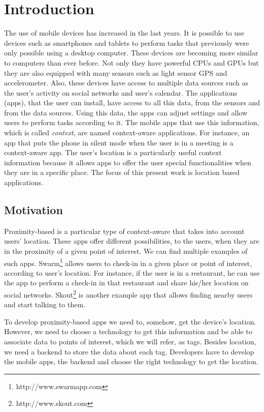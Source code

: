 
\chapter{Introduction}
\label{chapter:introduction}
The use of mobile devices has increased in the last years.
It is possible to use devices such as smartphones and tablets to perform tasks that previously were only possible using a desktop computer.
These devices are becoming more similar to computers than ever before.
Not only they have powerful \glspl{CPU} and \glspl{GPU} but they are also equipped with many sensors such as light sensor \gls{GPS} and accelerometer.
Also, these devices have access to multiple data sources such as
the user's activity on social networks and user's calendar.
The applications (apps), that the user can install, have access to all this data, from the sensors and from the data sources.
Using this data, the apps can adjust settings and allow users to perform tasks according to it.
The mobile apps that use this information, which is called \emph{context}, are named context-aware applications.
For instance, an app that puts the phone in silent mode when the user is in a meeting is a context-aware app.
The user's location is a particularly useful context information because it allows apps to offer the user special functionalities when they are in a specific place.
The focus of this present work is location based applications.

\section{Motivation}
\label{sec:introduction_motivation}
Proximity-based is a particular type of context-aware that takes into account users' location.
These apps offer different possibilities, to the users, when they are in the proximity of a given point of interest.
We can find multiple examples of such apps.
Swarm\footnote{http://www.swarmapp.com} allows users to check-in in a given place or point of interest, according to user's location.
For instance, if the user is in a restaurant, he can use the app to perform a check-in in that restaurant and share his/her location on social networks.
Skout\footnote{http://www.skout.com}
is another example app that allows finding nearby users and start talking to them.

To develop proximity-based apps we need to, somehow, get the device's location.
However, we need to choose a technology to get this information and be able to associate data to points of interest, which we will refer, as tags.
Besides location, we need a backend to store the data about each tag.
Developers have to develop the mobile apps, the backend and choose the right technology to get the location.

